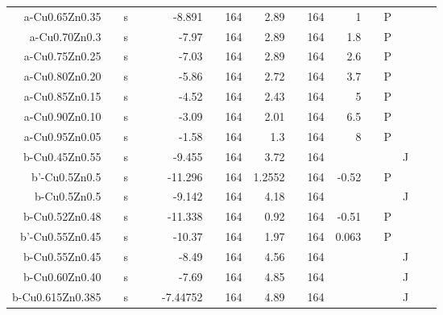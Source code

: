 \begin{table}[htbp]
\begin{adjustbox}{width=1\textwidth}
\begin{tabular}{rrrrrrrrrrrrrrrrr}
    a-Cu0.65Zn0.35 &       & s     &       &       & -8.891 &       & 164   & 2.89  &       & 164   & 1     &       & P     &       &       &  \\
    a-Cu0.70Zn0.3 &       & s     &       &       & -7.97 &       & 164   & 2.89  &       & 164   & 1.8   &       & P     &       &       &  \\
    a-Cu0.75Zn0.25 &       & s     &       &       & -7.03 &       & 164   & 2.89  &       & 164   & 2.6   &       & P     &       &       &  \\
    a-Cu0.80Zn0.20 &       & s     &       &       & -5.86 &       & 164   & 2.72  &       & 164   & 3.7   &       & P     &       &       &  \\
    a-Cu0.85Zn0.15 &       & s     &       &       & -4.52 &       & 164   & 2.43  &       & 164   & 5     &       & P     &       &       &  \\
    a-Cu0.90Zn0.10 &       & s     &       &       & -3.09 &       & 164   & 2.01  &       & 164   & 6.5   &       & P     &       &       &  \\
    a-Cu0.95Zn0.05 &       & s     &       &       & -1.58 &       & 164   & 1.3   &       & 164   & 8     &       & P     &       &       &  \\
    b-Cu0.45Zn0.55 &       & s     &       &       & -9.455 &       & 164   & 3.72  &       & 164   &       &       &       & J     &       &  \\
    b'-Cu0.5Zn0.5 &       & s     &       &       & -11.296 &       & 164   & 1.2552 &       & 164   & -0.52 &       & P     &       &       &  \\
    b-Cu0.5Zn0.5 &       & s     &       &       & -9.142 &       & 164   & 4.18  &       & 164   &       &       &       & J     &       &  \\
    b-Cu0.52Zn0.48 &       & s     &       &       & -11.338 &       & 164   & 0.92  &       & 164   & -0.51 &       & P     &       &       &  \\
    b'-Cu0.55Zn0.45 &       & s     &       &       & -10.37 &       & 164   & 1.97  &       & 164   & 0.063 &       & P     &       &       &  \\
    b-Cu0.55Zn0.45 &       & s     &       &       & -8.49 &       & 164   & 4.56  &       & 164   &       &       &       & J     &       &  \\
    b-Cu0.60Zn0.40 &       & s     &       &       & -7.69 &       & 164   & 4.85  &       & 164   &       &       &       & J     &       &  \\
    b-Cu0.615Zn0.385 &       & s     &       &       & -7.44752 &       & 164   & 4.89  &       & 164   &       &       &       & J     &       &  \\

\end{tabular}
\end{adjustbox}
\end{table}
